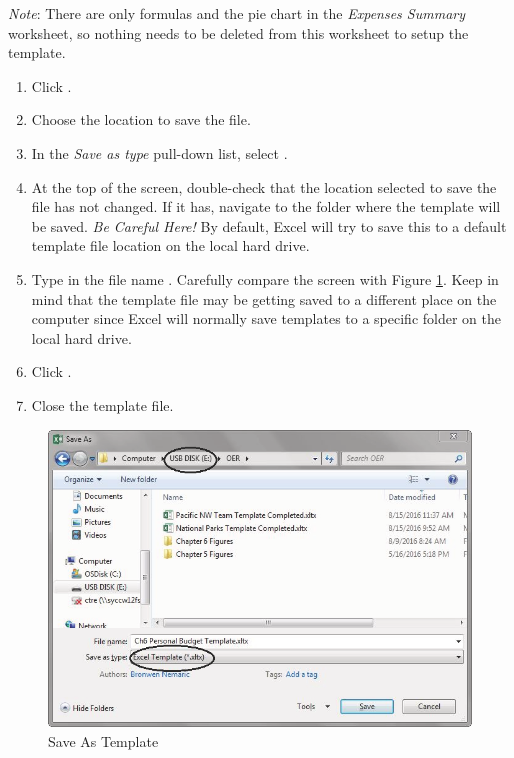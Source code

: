 \textit{Note}: There are only formulas and the pie chart in the \textit{Expenses Summary} worksheet, so nothing needs to be deleted from this worksheet to setup the template.

\begin{enumerate}
	\item Click .
	\item Choose the location to save the file.
	\item In the \textit{Save as type} pull-down list, select .
	\item At the top of the screen, double-check that the location selected to save the file has not changed. If it has, navigate to the folder where the template will be saved. \textit{Be Careful Here!} By default, Excel will try to save this to a default template file location on the local hard drive.
	\item Type in the file name . Carefully compare the screen with Figure \ref{06:fig11}. Keep in mind that the template file may be getting saved to a different place on the computer since Excel will normally save templates to a specific folder on the local hard drive.
	\item Click .
	\item Close the template file.
\end{enumerate}

\begin{figure}[H]
	\centering
	\includegraphics[width=\maxwidth{.95\linewidth}]{gfx/ch06_fig11}
	\caption{Save As Template}
	\label{06:fig11}
\end{figure}

